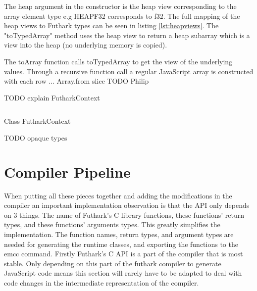 \documentclass[11pt]{book}
\begin{document}
The heap argument in the constructor is the heap view corresponding to the array element type e.g HEAPF32 corresponds to f32. The full mapping of the heap views to Futhark types can be seen in listing \ref{lst:heapviews}.
The "toTypedArray" method uses the heap view to return a heap subarray which is a view into the heap (no underlying memory is copied).

The toArray function calls toTypedArray to get the view of the underlying values. Through a recursive function call a regular JavaScript array is constructed with each row ... Array.from slice TODO Philip




TODO explain FutharkContext

\begin{listing}[H] 
        \inputminted[fontsize=\small,baselinestretch=0.5,linenos]{JavaScript}{code/compiler/api_examples/FutharkContext.js}
        \caption{Class FutharkContext}
        \label{lst:FutharkContext}    
\end{listing} 

TODO opaque types


\section{Compiler Pipeline}

When putting all these pieces together and adding the modifications in the compiler an important implementation observation is that the API only depends on 3 things. The name of Futhark's C library functions, these functions' return types, and these functions' arguments types. This greatly simplifies the implementation. The function names, return types, and argument types are needed for generating the runtime classes, and exporting the functions to the emcc command. Firstly Futhark's C API is a part of the compiler that is most stable. Only depending on this part of the futhark compiler to generate JavaScript code means this section will rarely have to be adapted to deal with code changes in the intermediate representation of the compiler.

\end{document}
